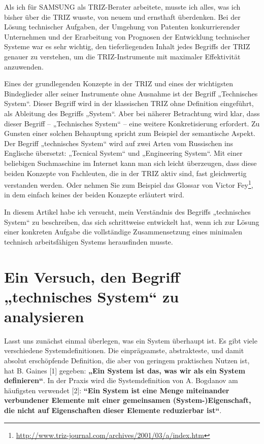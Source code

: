 \documentclass[11pt,a4paper]{article}
\begin{document}
Als ich für SAMSUNG als TRIZ-Berater arbeitete, musste ich alles, was ich
bisher über die TRIZ wusste, von neuem und ernsthaft überdenken. Bei der
Lösung technischer Aufgaben, der Umgehung von Patenten konkurrierender
Unternehmen und der Erarbeitung von Prognosen der Entwicklung technischer
Systeme war es sehr wichtig, den tieferliegenden Inhalt jedes Begriffs der
TRIZ genauer zu verstehen, um die TRIZ-Instrumente mit maximaler Effektivität
anzuwenden.

Eines der grundlegenden Konzepte in der TRIZ und eines der wichtigsten
Bindeglieder aller seiner Instrumente ohne Ausnahme ist der Begriff
„Technisches System“. Dieser Begriff wird in der klassischen TRIZ ohne
Definition eingeführt, als Ableitung des Begriffs „System“. Aber bei näherer
Betrachtung wird klar, dass dieser Begriff -- „Technisches System“ -- eine
weitere Konkretisierung erfordert. Zu Gunsten einer solchen Behauptung spricht
zum Beispiel der semantische Aspekt. Der Begriff „technisches System“ wird auf
zwei Arten vom Russischen ins Englische übersetzt: „Tecnical System“ und
„Engineering System“.  Mit einer beliebigen Suchmaschine im Internet kann man
sich leicht überzeugen, dass diese beiden Konzepte von Fachleuten, die in der
TRIZ aktiv sind, fast gleichwertig verstanden werden. Oder nehmen Sie zum
Beispiel das Glossar von Victor
Fey\footnote{\url{http://www.triz-journal.com/archives/2001/03/a/index.htm}},
in dem einfach keines der beiden Konzepte erläutert wird.

In diesem Artikel habe ich versucht, mein Verständnis des Begriffs
„technisches System“ zu beschreiben, das sich schrittweise entwickelt hat,
wenn ich zur Lösung einer konkreten Aufgabe die vollständige Zusammensetzung
eines minimalen technisch arbeitsfähigen Systems herausfinden musste.

\section*{Ein Versuch, den Begriff „technisches System“ zu analysieren}

Lasst uns zunächst einmal überlegen, was ein System überhaupt ist. Es gibt
viele verschiedene Systemdefinitionen. Die einprägsamste, abstrakteste, und
damit absolut erschöpfende Definition, die aber von geringem praktischen
Nutzen ist, hat B. Gaines [1] gegeben: \textbf{„Ein System ist das, was wir
  als ein System definieren“}.  In der Praxis wird die Systemdefinition von
A. Bogdanov am häufigsten verwendet [2]: \textbf{“Ein System ist eine Menge
  miteinander verbundener Elemente mit einer gemeinsamen (System-)Eigenschaft,
  die nicht auf Eigenschaften dieser Elemente reduzierbar ist“}.
\end{document}

